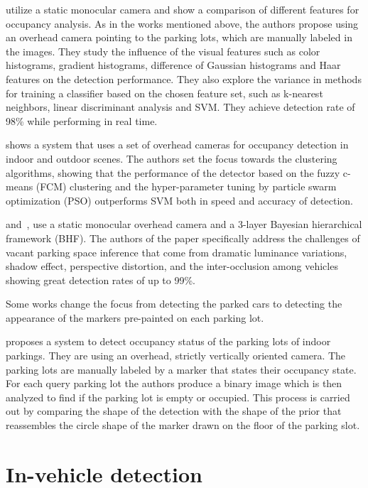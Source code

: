 \citet{tschentscher} utilize a static monocular camera and show a comparison
of different features for occupancy analysis. As in the works mentioned above,
the authors propose using an overhead camera pointing to the parking lots,
which are manually labeled in the images. They study the influence of the
visual features such as color histograms, gradient histograms, difference of
Gaussian histograms and Haar features on the detection performance. They also
explore the variance in methods for training a classifier based on the chosen
feature set, such as k-nearest neighbors, linear discriminant analysis and
SVM\@. They achieve detection rate of 98\% while performing in real time.

\citet{ichihashi} shows a system that uses a set of overhead cameras for
occupancy detection in indoor and outdoor scenes. The authors set the focus
towards the clustering algorithms, showing that the performance of the
detector based on the fuzzy c-means (FCM) clustering and the hyper-parameter
tuning by particle swarm optimization (PSO) outperforms SVM both in speed and
accuracy of detection.

\citet{chingchun10} and~\citet{chingjao10}, use a static monocular overhead
camera and a 3-layer Bayesian hierarchical framework (BHF). The authors of the
paper specifically address the challenges of vacant parking space inference
that come from dramatic luminance variations, shadow effect, perspective
distortion, and the inter-occlusion among vehicles showing great detection
rates of up to 99\%.

Some works change the focus from detecting the parked cars to detecting the
appearance of the markers pre-painted on each parking lot.

\citet{yusnita12} proposes a system to detect occupancy status of the parking
lots of indoor parkings. They are using an overhead, strictly vertically
oriented camera. The parking lots are manually labeled by a marker that states
their occupancy state. For each query parking lot the authors produce a binary
image which is then analyzed to find if the parking lot is empty or occupied.
This process is carried out by comparing the shape of the detection with the
shape of the prior that reassembles the circle shape of the marker drawn on
the floor of the parking slot.


\section{In-vehicle detection} %
\label{sec:in_vehicle_detection}

